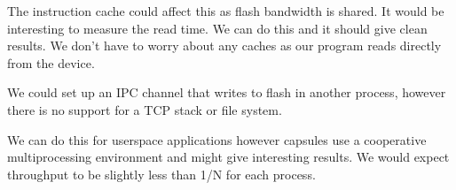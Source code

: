 \documentclass{article}
\begin{document}
The instruction cache could affect this as flash bandwidth is shared. It would be interesting to measure the read time. We can do this and it should give clean results. We don't have to worry about any caches as our program reads directly from the device.

We could set up an IPC channel that writes to flash in another process, however there is no support for a TCP stack or file system.


We can do this for userspace applications however capsules use a cooperative multiprocessing environment and might give interesting results. We would expect throughput to be slightly less than 1/N for each process. 

\printbibliography
\end{document}
